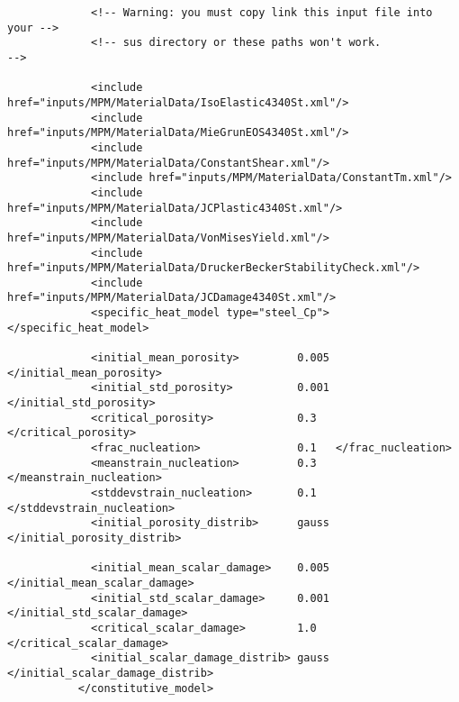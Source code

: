 \begin{lstlisting}
             <!-- Warning: you must copy link this input file into your -->
             <!-- sus directory or these paths won't work.              -->

             <include href="inputs/MPM/MaterialData/IsoElastic4340St.xml"/>
             <include href="inputs/MPM/MaterialData/MieGrunEOS4340St.xml"/>
             <include href="inputs/MPM/MaterialData/ConstantShear.xml"/>
             <include href="inputs/MPM/MaterialData/ConstantTm.xml"/>
             <include href="inputs/MPM/MaterialData/JCPlastic4340St.xml"/>
             <include href="inputs/MPM/MaterialData/VonMisesYield.xml"/>
             <include href="inputs/MPM/MaterialData/DruckerBeckerStabilityCheck.xml"/>
             <include href="inputs/MPM/MaterialData/JCDamage4340St.xml"/>
             <specific_heat_model type="steel_Cp"> </specific_heat_model>

             <initial_mean_porosity>         0.005 </initial_mean_porosity>
             <initial_std_porosity>          0.001 </initial_std_porosity>
             <critical_porosity>             0.3   </critical_porosity>
             <frac_nucleation>               0.1   </frac_nucleation>
             <meanstrain_nucleation>         0.3   </meanstrain_nucleation>
             <stddevstrain_nucleation>       0.1   </stddevstrain_nucleation>
             <initial_porosity_distrib>      gauss </initial_porosity_distrib>

             <initial_mean_scalar_damage>    0.005  </initial_mean_scalar_damage>
             <initial_std_scalar_damage>     0.001 </initial_std_scalar_damage>
             <critical_scalar_damage>        1.0   </critical_scalar_damage>
             <initial_scalar_damage_distrib> gauss </initial_scalar_damage_distrib>
           </constitutive_model>                                      
       

\end{lstlisting}

